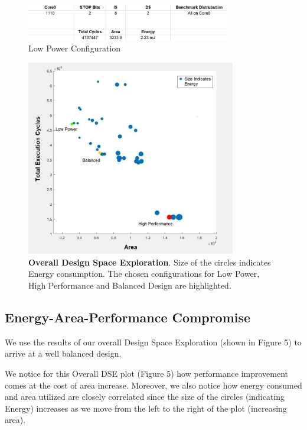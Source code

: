 \documentclass[conference]{IEEEtran}
\begin{document}
\begin{figure}[h!]
\centering
\includegraphics[width=3.5in]{LowPower.JPG}
\caption{\label{fig:data} Low Power Configuration }
\end{figure}
\begin{figure}[h!]
\centering
\includegraphics[width=3.6in]{FinalPlot.jpg}
\caption{\label{fig:data} \textbf{Overall Design Space Exploration}. Size of the circles indicates Energy consumption. The chosen configurations for Low Power, High Performance and Balanced Design are highlighted.}
\end{figure}

\subsection{Energy-Area-Performance Compromise}

We use the results of our overall Design Space Exploration (shown in Figure 5) to arrive at a well balanced design.

We notice for this Overall DSE plot (Figure 5) how performance improvement comes at the cost of area increase. Moreover, we also notice how energy consumed and area utilized are closely correlated since the size of the circles (indicating Energy) increases as we move from the left to the right of the plot (increasing area).
\end{document}
